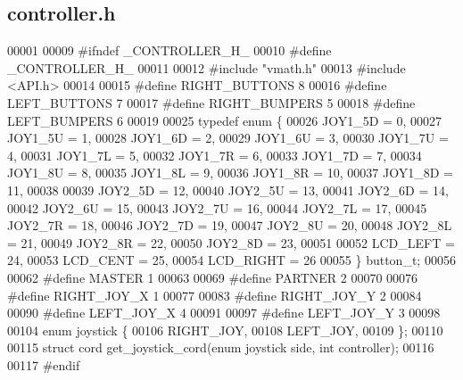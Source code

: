 \subsection{controller.\+h}
\label{controller_8h_source}

\begin{DoxyCode}
00001 
00009 \textcolor{preprocessor}{#ifndef \_CONTROLLER\_H\_}
00010 \textcolor{preprocessor}{#define \_CONTROLLER\_H\_}
00011 
00012 \textcolor{preprocessor}{#include "vmath.h"}
00013 \textcolor{preprocessor}{#include <API.h>}
00014 
00015 \textcolor{preprocessor}{#define RIGHT\_BUTTONS 8}
00016 \textcolor{preprocessor}{#define LEFT\_BUTTONS 7}
00017 \textcolor{preprocessor}{#define RIGHT\_BUMPERS 5}
00018 \textcolor{preprocessor}{#define LEFT\_BUMPERS 6}
00019 
00025 \textcolor{keyword}{typedef} \textcolor{keyword}{enum} \{
00026   JOY1_5D = 0,
00027   JOY1_5U = 1,
00028   JOY1_6D = 2,
00029   JOY1_6U = 3,
00030   JOY1_7U = 4,
00031   JOY1_7L = 5,
00032   JOY1_7R = 6,
00033   JOY1_7D = 7,
00034   JOY1_8U = 8,
00035   JOY1_8L = 9,
00036   JOY1_8R = 10,
00037   JOY1_8D = 11,
00038 
00039   JOY2_5D = 12,
00040   JOY2_5U = 13,
00041   JOY2_6D = 14,
00042   JOY2_6U = 15,
00043   JOY2_7U = 16,
00044   JOY2_7L = 17,
00045   JOY2_7R = 18,
00046   JOY2_7D = 19,
00047   JOY2_8U = 20,
00048   JOY2_8L = 21,
00049   JOY2_8R = 22,
00050   JOY2_8D = 23,
00051 
00052   LCD_LEFT = 24,
00053   LCD_CENT = 25,
00054   LCD_RIGHT = 26
00055 \} button_t;
00056 
00062 \textcolor{preprocessor}{#define MASTER 1}
00063 
00069 \textcolor{preprocessor}{#define PARTNER 2}
00070 
00076 \textcolor{preprocessor}{#define RIGHT\_JOY\_X 1}
00077 
00083 \textcolor{preprocessor}{#define RIGHT\_JOY\_Y 2}
00084 
00090 \textcolor{preprocessor}{#define LEFT\_JOY\_X 4}
00091 
00097 \textcolor{preprocessor}{#define LEFT\_JOY\_Y 3}
00098 
00104 \textcolor{keyword}{enum} joystick \{
00106   RIGHT_JOY,
00108   LEFT_JOY,
00109 \};
00110 
00115 \textcolor{keyword}{struct }cord get_joystick_cord(enum joystick side, int controller);
00116 
00117 \textcolor{preprocessor}{#endif}
\end{DoxyCode}
